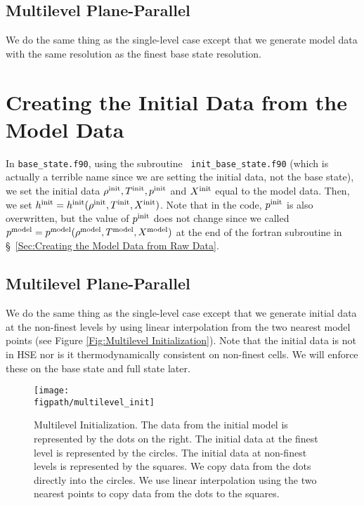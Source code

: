 \subsection{Multilevel Plane-Parallel}
We do the same thing as the single-level case except that we generate
model data with the same resolution as the finest base state
resolution.


\section{Creating the Initial Data from the Model Data}
In {\tt base\_state.f90}, using the subroutine {\tt
  init\_base\_state.f90} (which is actually a terrible name since we
are setting the initial data, not the base state), we set the initial
data $\rho^{\rm init}, T^{\rm init}, p^{\rm init}$ and $X^{\rm init}$ equal to the
model data.  Then, we set $h^{\rm init} =
h^{\rm init}(\rho^{\rm init},T^{\rm init},X^{\rm init})$.  Note that in the code,
$p^{\rm init}$ is also overwritten, but the value of $p^{\rm init}$ does not
change since we called $p^{\rm model} =
p^{\rm model}(\rho^{\rm model},T^{\rm model},X^{\rm model})$ at the end of the
fortran subroutine in \S~\ref{Sec:Creating the Model Data from Raw
  Data}.

\subsection{Multilevel Plane-Parallel}
We do the same thing as the single-level case except that we generate
initial data at the non-finest levels by using linear interpolation
from the two nearest model points (see Figure \ref{Fig:Multilevel
  Initialization}).  Note that the initial data is not in HSE nor is
it thermodynamically consistent on non-finest cells.  We will enforce
these on the base state and full state later.
\begin{figure}[tpb]
\centering
\texttt{[image: \\figpath/multilevel\_init]}\hspace{0.2in}
\begin{minipage}[b]{5.0in}
\caption[Multi-level initial model initialization]
 {Multilevel Initialization.  The data from the initial model
  is represented by the dots on the right.  The initial data at the
  finest level is represented by the circles.  The initial data at
  non-finest levels is represented by the squares.  We copy data from
  the dots directly into the circles.  We use linear interpolation
  using the two nearest points to copy data from the dots to the
  squares.\vspace{2em}}
\end{minipage}
\label{Fig:Multilevel Initialization}
\end{figure}


